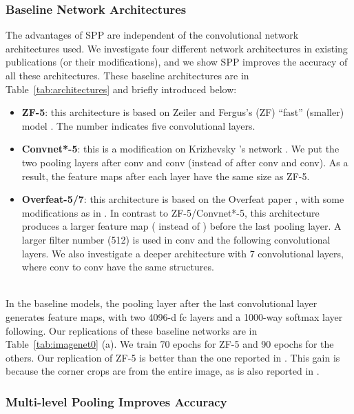 \documentclass[10pt,journal,cspaper,compsoc]{IEEEtran}
\begin{document}
\subsubsection{Baseline Network Architectures}

The advantages of SPP are independent of the convolutional network architectures used. We investigate four different network architectures in existing publications \cite{Krizhevsky2012,Zeiler2013,Sermanet2013} (or their modifications), and we show SPP improves the accuracy of all these architectures. These baseline architectures are in Table~\ref{tab:architectures} and briefly introduced below:

\begin{itemize}
  \item \textbf{ZF-5}: this architecture is based on Zeiler and Fergus's (ZF) ``fast'' (smaller) model \cite{Zeiler2013}. The number indicates five convolutional layers.
  \item \textbf{Convnet*-5}: this is a modification on Krizhevsky \etal's network \cite{Krizhevsky2012}. We put the two pooling layers after conv and conv (instead of after conv and conv). As a result, the feature maps after each layer have the same size as ZF-5.
  \item \textbf{Overfeat-5/7}: this architecture is based on the Overfeat paper \cite{Sermanet2013}, with some modifications as in \cite{Chatfield2014}. In contrast to ZF-5/Convnet*-5, this architecture produces a larger feature map ( instead of ) before the last pooling layer. A larger filter number (512) is used in conv and the following convolutional layers. We also investigate a deeper architecture with 7 convolutional layers, where conv to conv have the same structures.
\end{itemize}
~\\
In the baseline models, the pooling layer after the last convolutional layer generates  feature maps, with two 4096-d fc layers and a 1000-way softmax layer following.
Our replications of these baseline networks are in Table~\ref{tab:imagenet0} (a). We train 70 epochs for ZF-5 and 90 epochs for the others.
Our replication of ZF-5 is better than the one reported in \cite{Zeiler2013}. This gain is because the corner crops are from the entire image, as is also reported in \cite{Howard2013}.

\subsubsection{Multi-level Pooling Improves Accuracy}
\label{subsec:multi_level_pooling}
\end{document}
